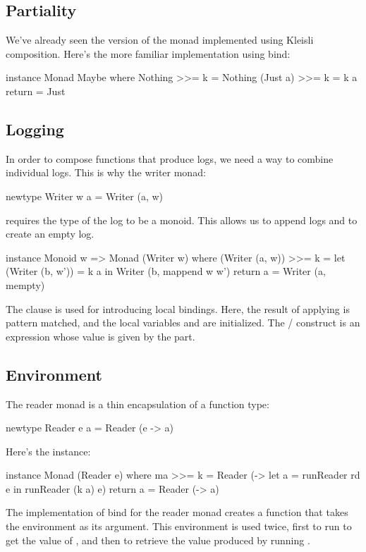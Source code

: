 \documentclass[DaoFP]{subfiles}
\begin{document}
\subsection{Partiality}
We've already seen the version of the  monad implemented using Kleisli composition. Here's the more familiar implementation using bind:
\begin{haskell}
instance Monad Maybe where
  Nothing >>= k = Nothing
  (Just a) >>= k = k a
  return = Just
\end{haskell}

\subsection{Logging}
In order to compose functions that produce logs, we need a way to combine individual logs. This is why the writer monad:
\begin{haskell}
newtype Writer w a = Writer (a, w)
\end{haskell}
requires the type of the log to be a monoid. This allows us to append logs and to create an empty log.
\begin{haskell}
instance Monoid w => Monad (Writer w) where
  (Writer (a, w)) >>= k = let (Writer (b, w')) = k a
                          in Writer (b, mappend w w')
  return a = Writer (a, mempty)
\end{haskell}
The  clause is used for introducing local bindings. Here, the result of applying  is pattern matched, and the local variables  and  are initialized. The / construct is an expression whose value is given by the  part.

\subsection{Environment}

The reader monad is a thin encapsulation of a function type:
\begin{haskell}
newtype Reader e a = Reader (e -> a)
\end{haskell}
Here's the  instance:
\begin{haskell}
instance Monad (Reader e) where
  ma >>= k = Reader (\e -> let a = runReader rd e
                           in runReader (k a) e)
  return a = Reader (\e -> a)
\end{haskell}
The implementation of bind for the reader monad creates a function that takes the environment as its argument. This environment is used twice, first to run  to get the value of , and then to retrieve the value produced by running .
\end{document}
